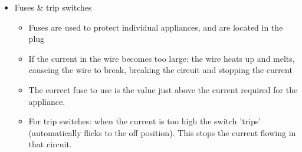 \documentclass[a4paper,12pt]{article}
\begin{document}
\begin{itemize}
\begin{itemize}
        \item The high current through the fuse causes it to melt and break.
        \item This cuts off the supply of electricity to the appliance, making it safe.
    \end{itemize}
    \item Fuses \& trip switches
    \begin{itemize}
        \item Fuses are used to protect individual appliances, and are located in the plug
        \item If the current in the wire becomes too large: the wire heats up and melts, causeing the wire to break, breaking the circuit and stopping the current
        \item The correct fuse to use is the value just above the current required for the appliance.
        \item For trip switches: when the current is too high the switch 'trips' (automatically flicks to the off position). This stops the current flowing in that circuit.
    \end{itemize}
\end{itemize}
\end{document}
